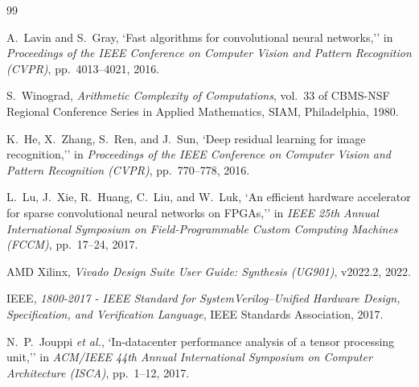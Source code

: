 \documentclass[12pt,a4paper]{article}
\begin{document}
\newpage
\begin{thebibliography}{99}

    A.~Lavin and S.~Gray, `Fast algorithms for convolutional neural networks,'' in \textit{Proceedings of the IEEE Conference on Computer Vision and Pattern Recognition (CVPR)}, pp.~4013--4021, 2016.

    S.~Winograd, \textit{Arithmetic Complexity of Computations}, vol.~33 of CBMS-NSF Regional Conference Series in Applied Mathematics, SIAM, Philadelphia, 1980.

    K.~He, X.~Zhang, S.~Ren, and J.~Sun, `Deep residual learning for image recognition,'' in \textit{Proceedings of the IEEE Conference on Computer Vision and Pattern Recognition (CVPR)}, pp.~770--778, 2016.

    L.~Lu, J.~Xie, R.~Huang, C.~Liu, and W.~Luk, `An efficient hardware accelerator for sparse convolutional neural networks on FPGAs,'' in \textit{IEEE 25th Annual International Symposium on Field-Programmable Custom Computing Machines (FCCM)}, pp.~17--24, 2017.

    AMD Xilinx, \textit{Vivado Design Suite User Guide: Synthesis (UG901)}, v2022.2, 2022.

    IEEE, \textit{1800-2017 - IEEE Standard for SystemVerilog--Unified Hardware Design, Specification, and Verification Language}, IEEE Standards Association, 2017.

    N.~P.~Jouppi \textit{et al.}, `In-datacenter performance analysis of a tensor processing unit,'' in \textit{ACM/IEEE 44th Annual International Symposium on Computer Architecture (ISCA)}, pp.~1--12, 2017.

\end{thebibliography}
\end{document}
